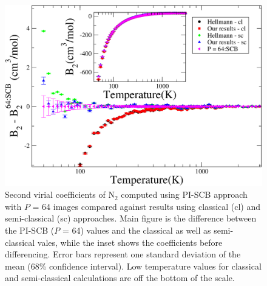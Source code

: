        \begin{figure}[!htbp]
            \centering
            \includegraphics[scale=0.20,keepaspectratio]{Chapter-5/Figures/B2N2AllCLSCDiff.png}
            \caption{Second virial coefficients of N$_2$ computed using PI-SCB approach with $P$ = 64 images compared against results using classical (cl) and semi-classical (sc) approaches. Main figure is the difference between the PI-SCB ($P$ = 64) values and the classical as well as semi-classical vales, while the inset shows the coefficients before differencing. Error bars represent one standard deviation of the mean (68\% confidence interval). Low temperature values for classical and semi-classical calculations are off the bottom of the scale.}
            \label{fig:B2N2AllCLSCDiff}
        \end{figure}

